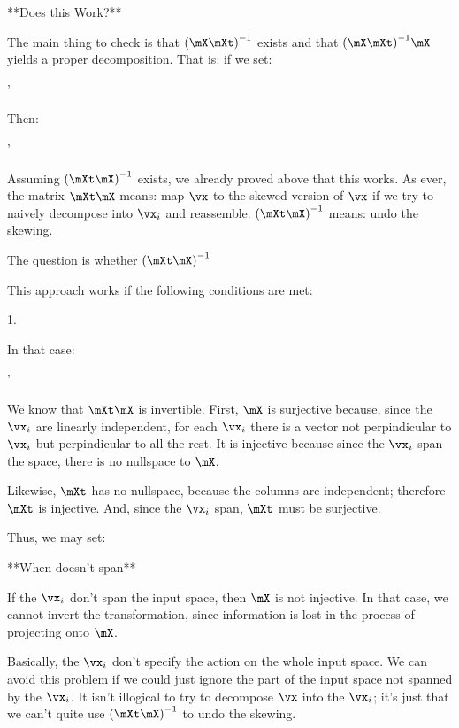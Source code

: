 **Does this Work?**

The main thing to check is that $\parensinv{\mX \mXt}$ exists and that
$\parensinv{\mX \mXt} \mX$ yields a proper decomposition. That is: if we set:

\begin{nedqn}
  \vx'
\eqcol
  \parensinv{\mX \mXt} \mX\vx
\end{nedqn}

Then:

\begin{nedqn}
  \vx
\eqcol
  \mXt \vx'
\end{nedqn}


Assuming $\parensinv{\mXt \mX}$ exists, we already proved above that
this works. As ever, the matrix $\mXt \mX$ means: map $\vx$ to the
skewed version of $\vx$ if we try to naively decompose into $\vx_i$ and
reassemble. $\parensinv{\mXt \mX}$ means: undo the skewing.

The question is whether $\parensinv{\mXt \mX}$

This approach works if the following conditions are met:

1.

In that case:

\begin{nedqn}
  \vx'
\eqcol
  \parensinv{\mXt \mX} \mX\vx
\end{nedqn}

We know that $\mXt \mX$ is invertible. First, $\mX$ is surjective
because, since the $\vx_i$ are linearly independent, for each $\vx_i$
there is a vector not perpindicular to $\vx_i$ but perpindicular to all
the rest. It is injective because since the $\vx_i$ span the space,
there is no nullspace to $\mX$.

Likewise, $\mXt$ has no nullspace, because the columns are
independent; therefore $\mXt$ is injective. And, since the $\vx_i$
span, $\mXt$ must be surjective.

Thus, we may set:


**When \mX doesn't span**

If the $\vx_i$ don't span the input space, then $\mX$ is not injective. In
that case, we cannot invert the transformation, since information is
lost in the process of projecting onto $\mX$.

Basically, the $\vx_i$ don't specify the action on the whole input
space. We can avoid this problem if we could just ignore the part of
the input space not spanned by the $\vx_i$. It isn't illogical to try to
decompose $\vx$ into the $\vx_i$; it's just that we can't quite use
$\parensinv{\mXt \mX}$ to undo the skewing.

